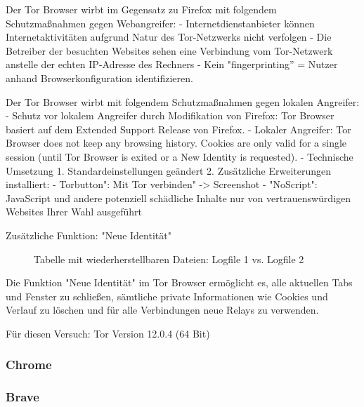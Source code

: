 Der Tor Browser wirbt im Gegensatz zu Firefox mit folgendem Schutzmaßnahmen gegen Webangreifer:
- Internetdienstanbieter können Internetaktivitäten aufgrund Natur des Tor-Netzwerks nicht verfolgen 
- Die Betreiber der besuchten Websites sehen eine Verbindung vom Tor-Netzwerk anstelle der echten IP-Adresse des Rechners
- Kein "fingerprinting” = Nutzer anhand Browserkonfiguration identifizieren.

Der Tor Browser wirbt mit folgendem Schutzmaßnahmen gegen lokalen Angreifer:
- Schutz vor lokalem Angreifer durch Modifikation von Firefox: Tor Browser basiert auf dem Extended Support Release von Firefox.
- Lokaler Angreifer: Tor Browser does not keep any browsing history. Cookies are only valid for a single session (until Tor Browser is exited or a New Identity is requested).
- Technische Umsetzung
1. Standardeinstellungen geändert
2. Zusätzliche Erweiterungen installiert:
	- Torbutton": Mit Tor verbinden" -> Screenshot
	- "NoScript":  JavaScript und andere potenziell schädliche Inhalte nur von vertrauenswürdigen Websites Ihrer Wahl ausgeführt

Zusätzliche Funktion: "Neue Identität"
\begin{figure}[h!]
	\caption{Tabelle mit wiederherstellbaren Dateien: Logfile 1 vs. Logfile 2}
\end{figure}
Die Funktion "Neue Identität" im Tor Browser ermöglicht es, alle aktuellen Tabs und Fenster zu schließen, sämtliche private Informationen wie Cookies und Verlauf zu löschen und für alle Verbindungen neue Relays zu verwenden.

Für diesen Versuch: Tor Version 12.0.4 (64 Bit)

\subsubsection*{Chrome}

\subsubsection*{Brave}

